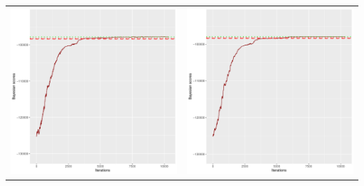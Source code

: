 \documentclass[]{scrartcl}
\begin{document}
\begin{table}[h!]
\begin{tabular}{cc}
\includegraphics[scale = 0.4]{./figs/hepar2/v2/25/bayBoundsEvolution-10352.pdf} & 
\includegraphics[scale = 0.4]{./figs/hepar2/v2/50/bayBoundsEvolution-10352.pdf} \\

\end{tabular}
\end{table}
\end{document}
